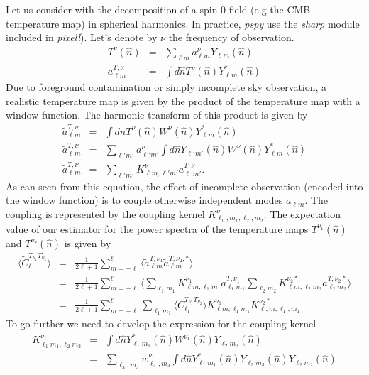 \documentclass[a4paper, 11pt]{article}
\def\ba{\begin{eqnarray}}
\def\ea{\end{eqnarray}}
\begin{document}
Let us consider with the decomposition of a spin 0 field (e.g the CMB temperature map) in spherical harmonics.
In practice, {\it pspy}  use the {\it sharp} module included in {\it pixell}). Let's denote by $\nu$ the frequency of observation.
\ba
T^{\nu}(\hat{n}) &=& \sum_{\ell m} a^{\nu}_{\ell m} Y_{\ell m}(\hat{n}) \\
a^{T, \nu}_{\ell m} &=& \int d \hat{n} T^{\nu}(\hat{n})  Y^{*}_{\ell m}(\hat{n})
\ea
Due to foreground contamination or simply incomplete sky observation, a realistic temperature map is given by the product of the temperature map with a window function. The harmonic transform of this product is given by
\ba
\tilde{a}^{T,\nu}_{\ell m} &=& \int d \hat{n} T^{\nu}(\hat{n}) W^{\nu}(\hat{n}) Y^{*}_{\ell m}(\hat{n}) \nonumber \\
\tilde{a}^{T,\nu}_{\ell m} &=& \sum_{\ell' m'} a^{\nu}_{\ell' m'} \int d \hat{n} Y_{\ell' m'}(\hat{n}) W^{\nu}(\hat{n}) Y^{*}_{\ell m}(\hat{n}) \nonumber \\
\tilde{a}^{T,\nu}_{\ell m} &=& \sum_{\ell' m'} K^{\nu}_{\ell m, \ell' m'} a^{T,\nu}_{\ell' m'} .
\ea
As can seen from this equation, the effect of incomplete observation (encoded into the window function) is to couple otherwise independent modes $a_{\ell m} $. The coupling is represented by the coupling kernel $K^{\nu}_{\ell_1,m_1, \ell_2, m_2}$.
The expectation value of our estimator for the power spectra of the temperature maps $T^{\nu_{1}}(\hat{n})$ and $T^{\nu_{2}}(\hat{n})$ is given by
\ba
\langle \tilde{C}^{T_{\nu_{1}}T_{\nu_{2}}}_{\ell} \rangle &=& \frac{1}{2\ell +1}\sum^{\ell}_{m=-\ell} \langle \tilde{a}^{T,\nu_{1}}_{\ell m} \tilde{a}^{T,\nu_{2}, *}_{\ell m} \rangle \\
&=&  \frac{1}{2\ell +1}\sum^{\ell}_{m=-\ell} \langle \sum_{\ell_1 m_1} K^{\nu_{1}}_{\ell m, \ell_1  m_1} a^{T,\nu_{1}}_{\ell_1 m_1}  \sum_{\ell_2 m_2} K^{\nu_{2}*}_{\ell m, \ell_2 m_2} a^{T,\nu_{2} *}_{\ell_2 m_2} \rangle \\
&=&  \frac{1}{2\ell +1}\sum^{\ell}_{m=-\ell}  \sum_{\ell_1 m_1} \langle C^{T_{\nu_{1}}T_{\nu_{2}}}_{\ell_1} \rangle K^{\nu_{1}}_{\ell m, \ell_1 m_1} K^{\nu_{2}*}_{\ell,m, \ell_1, m_1}
\ea
To go further we need to develop the expression for the coupling kernel
\ba
K^{\nu_{1}}_{\ell_1 m_1, \ell_2  m_2} &=& \int d \hat{n} Y^{*}_{\ell_1 m_1}(\hat{n}) W^{\nu_{1}}(\hat{n}) Y_{\ell_2 m_2}(\hat{n}) \\
&=& \sum_{ \ell_3, m_3} w^{\nu_{1}}_{ \ell_3, m_3}  \int d \hat{n} Y^{*}_{\ell_1 m_1}(\hat{n}) Y_{\ell_3 m_3} (\hat{n}) Y_{\ell_2 m_2}(\hat{n})
\ea
\end{document}
